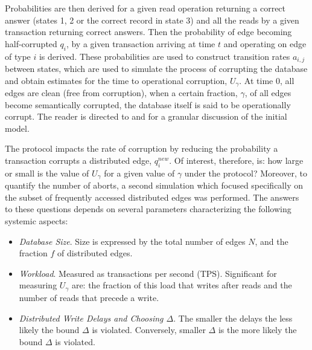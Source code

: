 Probabilities are then derived for a given read operation returning a correct answer (states 1, 2 or the correct record in state 3) and all the reads by a given transaction returning correct answers. Then the probability of edge becoming half-corrupted $q_i$, by a given transaction arriving at time $t$ and operating on edge of type $i$ is derived. These probabilities are used to construct transition rates $a_{i,j}$ between states, which are used to simulate the process of corrupting the database and obtain estimates for the time to operational corruption, $U_{\gamma}$. At time $0$, all edges are clean (free from corruption), when a certain fraction, $\gamma$, of all edges become semantically corrupted, the database itself is said to be operationally corrupt. The reader is directed to \cite{Ezhilchelvan2018} and \cite{Webber2019} for a granular discussion of the initial model.


The \tDelta protocol impacts the rate of corruption by reducing the probability a transaction corrupts a distributed edge, $q^{new}_i$. Of interest, therefore, is: how large or small is the value of $U_\gamma$ for a given value of $\gamma$ under the \tDelta protocol? Moreover, to quantify the number of aborts, a second simulation which focused specifically on the subset of frequently accessed distributed edges was performed. The answers to these questions depends on several parameters characterizing the following systemic aspects:
\begin{itemize}
\item \emph{Database Size}. Size is expressed by the total number of edges $N$, and the fraction $f$ of distributed edges.
\item \emph{Workload}. Measured as transactions per second (TPS). Significant for measuring $U_{\gamma}$ are: the fraction of this load that writes after reads and the number of reads that precede a write.
\item \emph{Distributed Write Delays and Choosing $\Delta$}. The smaller the delays the less likely the bound $\Delta$ is violated. Conversely, smaller $\Delta$ is the more likely the bound $\Delta$ is violated.
\end{itemize}
